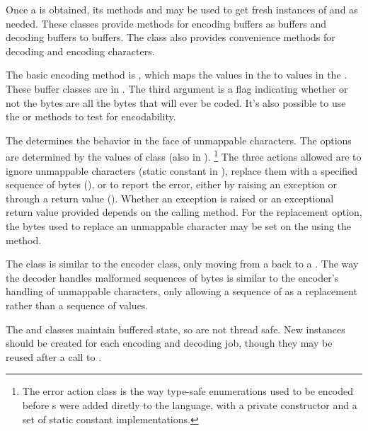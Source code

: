 Once a  is obtained, its methods  and
 may be used to get fresh instances of
 and  as needed. These classes
provide methods for encoding  buffers as 
buffers and decoding  buffers to  buffers.  The
 class also provides convenience methods for decoding
and encoding characters.

The basic encoding method is
, which maps the
 values in the  to  values in
the .  These buffer classes are in .
The third argument is a flag indicating whether or not the bytes are
all the bytes that will ever be coded.  It's also possible to use the
 or  methods to
test for encodability.  

The  determines the behavior in the face of
unmappable characters.  The options are determined by the values of
class  (also in ).%
%
\footnote{The error action class is the way type-safe enumerations used to
be encoded before s were added diretly to the language, with
a private constructor and a set of static constant implementations.}%
%
The three actions allowed are to ignore unmappable characters (static
constant  in ), replace them with
a specified sequence of bytes (), or to report the
error, either by raising an exception or through a return value
().  Whether an exception is raised or an exceptional return
value provided depends on the calling method.  For the replacement option,
the bytes used to replace an unmappable character may be set on the
 using the  method.

The  class is similar to the encoder class, only
moving from a  back to a .  The way
the decoder handles malformed sequences of bytes is similar to the
encoder's handling of unmappable characters, only allowing a sequence
of  as a replacement rather than a sequence of 
values.

The  and  classes maintain
buffered state, so are not thread safe.  New instances should be
created for each encoding and decoding job, though they may be reused
after a call to .



